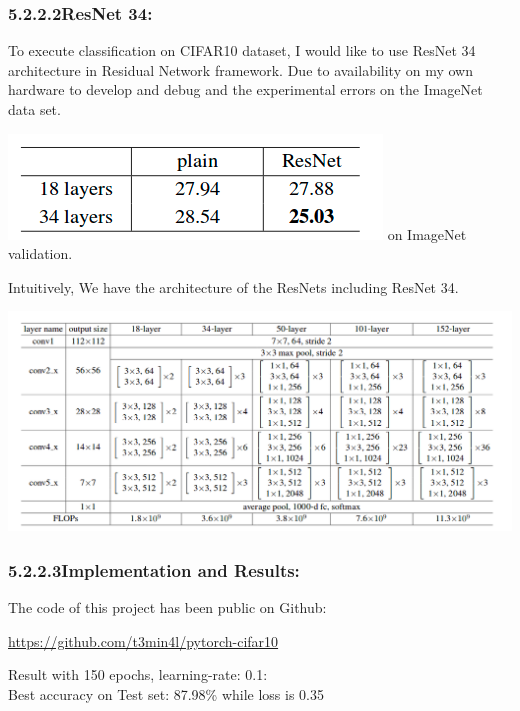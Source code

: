 \subsubsection*{5.2.2.2\hspace{0.5cm}ResNet 34:}
To execute classification on CIFAR10 dataset, I would like to use ResNet 34 architecture in Residual Network framework. Due to availability on my own hardware to develop and debug and the experimental errors on the ImageNet data set.
\begin{center}
\includegraphics[scale=0.5]{image-net_err.png}
 on ImageNet validation.
\end{center}
\pagebreak
Intuitively, We have the architecture of the ResNets including ResNet 34.
\begin{center}
\includegraphics[width=\textwidth]{resnet-architecture.png}
\end{center}
\subsubsection*{5.2.2.3\hspace{0.5cm}Implementation and Results:}
\hspace{0.2cm} The code of this project has been public on Github: \\
\begin{center}
\url{https://github.com/t3min4l/pytorch-cifar10}
\end{center}
\par Result with 150 epochs, learning-rate: 0.1:\\ Best accuracy on Test set: 87.98\% while loss is 0.35
